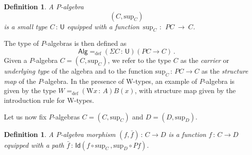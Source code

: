 \documentclass[10pt,a4paper,oneside,reqno]{amsart}
\numberwithin{equation}{section}
\theoremstyle{mythm}
\theoremstyle{mydef}
\newtheorem{definition}[theorem]{Definition}
\theoremstyle{myrmk}
\newcommand{\defeq}{=_{\mathrm{def}}}
\newcommand{\co}{\,{:}\,}
\newcommand{\Id}{\mathsf{Id}}
\newcommand{\W}{\mathrm{W}}
\newcommand{\U}{\mathsf{U}}
\newcommand{\Palg}{\mathsf{Alg}}
\renewcommand{\sup}{\mathrm{sup}}
\begin{document}
\begin{definition} A \emph{$P$-algebra} 
\[
(C, \sup_C)
\] 
is a small type $C \co \U$ equipped with a function~$\sup_C~\co~PC~\to~C$. 
\end{definition}

\smallskip

 The type of $P$-algebras is then defined as 
 \[
 \Palg  \defeq (\Sigma C \co \U) (PC \to C) \, .
 \]
 Given a $P$-algebra $C = (C, \sup_C)$,
 we refer to the type $C$ as the \emph{carrier} or \emph{underlying type} of the algebra and to the function $\sup_C \co PC\to C$ as the \emph{structure map} of the $P$-algebra. 
  In the
 presence of W-types, an example of $P$-algebra is given by the type $W \defeq (\W x\co A)B(x)$, with structure map given by the introduction rule for W-types. 
 
 \medskip
 
Let us now fix $P$-algebras $C = (C, \sup_C)$ and $D = (D, \sup_D)$. 

\begin{definition} A \emph{$P$-algebra morphism} $(f, \bar{f}) \co C \to D$ 
is a function $f \co C \rightarrow D$ equipped with a path $\bar{f} \co \Id( f \circ \sup_C \, , \sup_{D} \circ P f)$.
\end{definition}
\end{document}
